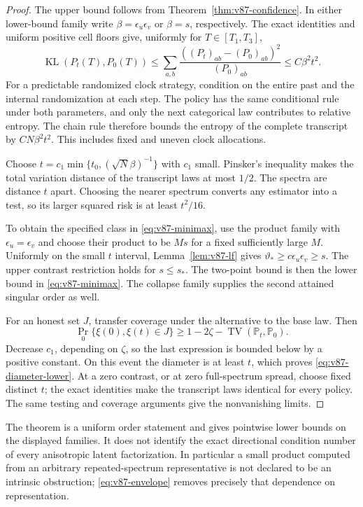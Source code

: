 \documentclass[11pt,reqno]{amsart}
\numberwithin{equation}{section}
\theoremstyle{definition}\newtheorem{definition}[theorem]{Definition}
\theoremstyle{remark}\newtheorem{remark}[theorem]{Remark}
\newcommand{\KL}{\operatorname{KL}}
\newcommand{\TV}{\operatorname{TV}}
\newcommand{\sig}{\vartheta}
\begin{document}
\begin{proof}
The upper bound follows from Theorem~\ref{thm:v87-confidence}.
In either lower-bound family write $\beta=\epsilon_u\epsilon_v$
or $\beta=s$, respectively. The exact identities and uniform
positive cell floors give, uniformly for $T\in[T_1,T_3]$,
\[
 \KL(P_t(T),P_0(T))
       \le\sum_{a,b}\frac{((P_t)_{ab}-(P_0)_{ab})^2}{(P_0)_{ab}}
       \le C\beta^2t^2.
\]
For a predictable randomized clock strategy, condition on the entire
past and the internal randomization at each step. The policy has the
same conditional rule under both parameters, and only the next
categorical law contributes to relative entropy. The chain rule
therefore bounds the entropy of the complete transcript by
$CN\beta^2t^2$. This includes fixed and uneven clock allocations.

Choose $t=c_1\min\{t_0,(\sqrt N\beta)^{-1}\}$ with $c_1$ small.
Pinsker's inequality makes the total variation distance of the
transcript laws at most $1/2$. The spectra are distance $t$ apart.
Choosing the nearer spectrum converts any estimator into a test, so
its larger squared risk is at least $t^2/16$.

To obtain the specified class in \eqref{eq:v87-minimax}, use the
product family with $\epsilon_u=\epsilon_v$ and choose their product
to be $M s$ for a fixed sufficiently large $M$. Uniformly on the
small $t$ interval, Lemma~\ref{lem:v87-lf} gives
$\sig_*\ge c\epsilon_u\epsilon_v\ge s$.
The upper contrast restriction holds for $s\le s_*$.
The two-point bound is then the lower bound in
\eqref{eq:v87-minimax}. The collapse family supplies the second
attained singular order as well.

For an honest set $J$, transfer coverage under the alternative to
the base law. Then
\[
 \Pr_0\{\xi(0),\xi(t)\in J\}
        \ge1-2\zeta-\TV(\mathbb P_t,\mathbb P_0).
\]
Decrease $c_1$, depending on $\zeta$, so the last expression is
bounded below by a positive constant. On this event the diameter
is at least $t$, which proves \eqref{eq:v87-diameter-lower}.
At a zero contrast, or at zero full-spectrum spread, choose fixed
distinct $t$; the exact identities make the transcript laws identical
for every policy. The same testing and coverage arguments give the
nonvanishing limits.
\end{proof}
The theorem is a uniform order statement and gives pointwise
lower bounds on the displayed families. It does not identify the
exact directional condition number of every anisotropic latent
factorization. In particular a small product computed from an
arbitrary repeated-spectrum representative is not declared to be
an intrinsic obstruction; \eqref{eq:v87-envelope} removes precisely
that dependence on representation.
\end{document}
